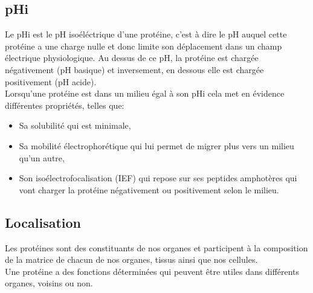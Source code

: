 \subsection*{pHi}
Le pHi est le pH isoéléctrique d'une protéine, c'est à dire le pH auquel cette protéine a une charge nulle et donc limite son déplacement dans un champ électrique physiologique.
Au dessus de ce pH, la protéine est chargée négativement (pH basique) et inversement, en dessous elle est chargée positivement (pH acide).\\
Lorsqu'une protéine est dans un milieu égal à son pHi cela met en évidence différentes propriétés, telles que:
\begin{itemize}
\item Sa solubilité qui est minimale,
\item Sa mobilité électrophorétique qui lui permet de migrer plus vers un milieu qu'un autre,
\item Son isoélectrofocalisation (IEF) qui repose sur ses peptides amphotères qui vont charger la protéine négativement ou positivement selon le milieu.
\end{itemize}

\subsection*{Localisation}
Les protéines sont des constituants de nos organes et participent à la composition de la matrice de chacun de nos organes, tissus ainsi que nos cellules.\\
Une protéine a des fonctions déterminées qui peuvent être utiles dans différents organes, voisins ou non. 





